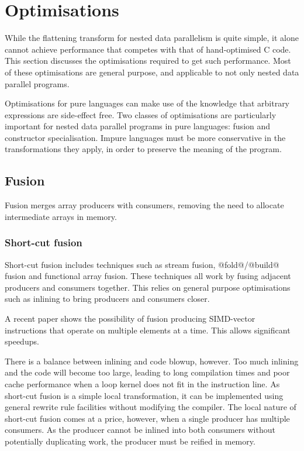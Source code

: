 \section{Optimisations}

While the flattening transform for nested data parallelism is quite simple,
it alone cannot achieve performance that competes with that of hand-optimised C code.
This section discusses the optimisations required to get such performance.
Most of these optimisations are general purpose, and applicable to not only nested data parallel programs.

Optimisations for pure languages can make use of the knowledge that arbitrary expressions are side-effect free.
Two classes of optimisations are particularly important for nested data parallel programs in pure languages: fusion and constructor specialisation.
Impure languages must be more conservative in the transformations they apply, in order to preserve the meaning of the program.


\subsection{Fusion}

Fusion merges array producers with consumers, removing the need to allocate intermediate arrays in memory.


\subsubsection{Short-cut fusion}

Short-cut fusion includes techniques such as stream fusion\cite{coutts2007streamfusion},
@fold@/@build@ fusion\cite{gill1993shortcut}
and functional array fusion\cite{chakravarty2001functional, chakravarty2003approach}.
These techniques all work by fusing adjacent producers and consumers together.
This relies on general purpose optimisations such as inlining to bring producers and consumers closer. 

A recent paper shows the possibility of fusion producing SIMD-vector instructions\cite{bik2004software} that operate on multiple elements at a time\cite{mainland2013haskell}.
This allows significant speedups.

There is a balance between inlining and code blowup, however.
Too much inlining and the code will become too large, leading to long compilation times and poor cache performance when a loop kernel does not fit in the instruction line.
As short-cut fusion is a simple local transformation, it can be implemented using general rewrite rule facilities\cite{jones2001playingby} without modifying the compiler.
The local nature of short-cut fusion comes at a price, however, when a single producer has multiple consumers.
As the producer cannot be inlined into both consumers without potentially duplicating work, the producer must be reified in memory.

